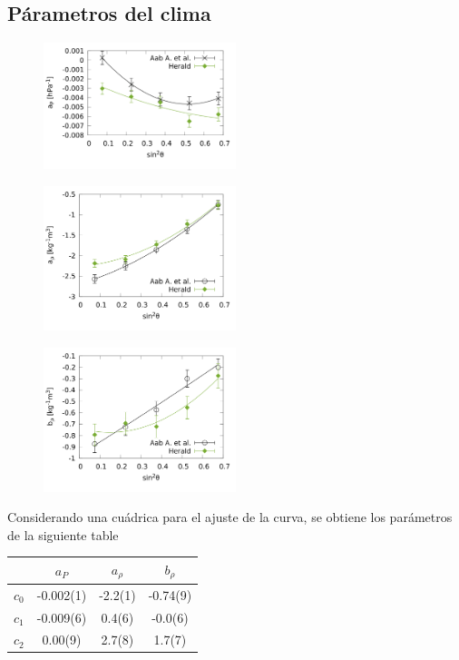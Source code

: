 \subsection{Párametros del clima}

\begin{figure}[H]
	\centering
	\includegraphics[width=0.5\textwidth]{ap.png}
\end{figure}


\begin{figure}[H]
	\centering
	\includegraphics[width=0.5\textwidth]{arho.png}
\end{figure}


\begin{figure}[H]
	\centering
	\includegraphics[width=0.5\textwidth]{brho.png}
\end{figure}

Considerando una cuádrica para el ajuste de la curva, se obtiene los parámetros de la siguiente table
\begin{table}[H]
\centering
\begin{tabular}{c|c|c|c}
		 	& $a_P$ 	&  $a_\rho$  & $ b_\rho$ \\ \hline
$c_0$ 		& -0.002(1) & 	-2.2(1)	 &	-0.74(9)\\ \hline
$c_1$ 		& -0.009(6)	& 	 0.4(6)	 &	-0.0(6)\\ \hline
$c_2$ 		&  0.00(9) 	& 	 2.7(8)  &	 1.7(7)\\ \hline
\end{tabular}
\end{table}


